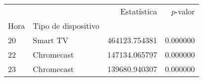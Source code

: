 \begin{tabular}{llrr}
\toprule
 &  & Estatística & $p$-valor \\
Hora & Tipo de dispositivo &  &  \\
\midrule
20 & Smart TV & 464123.754381 & 0.000000 \\
\cline{1-4}
22 & Chromecast & 147134.065797 & 0.000000 \\
\cline{1-4}
23 & Chromecast & 139680.940307 & 0.000000 \\
\cline{1-4}
\bottomrule
\end{tabular}
